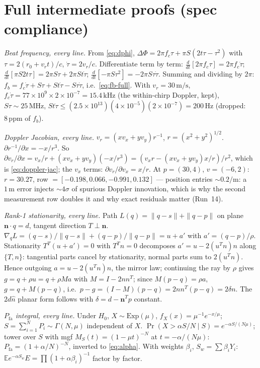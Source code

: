 \documentclass[11pt,oneside]{book}
\begin{document}
\section{Full intermediate proofs (spec compliance)}
\label{sec:full-proofs}

\emph{Beat frequency, every line.} From \cref{eq:dphi},
$\Delta\Phi=2\pi f_c\tau+\pi S(2t\tau-\tau^2)$ with $\tau=2(r_0+v_rt)/c$,
$\dot\tau=2v_r/c$. Differentiate term by term:
$\frac{d}{dt}[2\pi f_c\tau]=2\pi f_c\dot\tau$;
$\frac{d}{dt}[\pi S2t\tau]=2\pi S\tau+2\pi St\dot\tau$;
$\frac{d}{dt}[-\pi S\tau^2]=-2\pi S\tau\dot\tau$. Summing and dividing by
$2\pi$: $f_b=f_c\dot\tau+S\tau+St\dot\tau-S\tau\dot\tau$, i.e.\
\cref{eq:fb-full}. With $v_r=30\,\mathrm{m/s}$,
$f_c\dot\tau=77\times10^9\times2\times10^{-7}=15.4\,\mathrm{kHz}$ (the
within-chirp Doppler, kept), $S\tau\sim25\,\mathrm{MHz}$,
$St\dot\tau\le(2.5\times10^{13})(4\times10^{-5})(2\times10^{-7})
=200\,\mathrm{Hz}$ (dropped: $8\,\mathrm{ppm}$ of $f_b$).

\emph{Doppler Jacobian, every line.} $v_r=(xv_x+yv_y)r^{-1}$,
$r=(x^2+y^2)^{1/2}$. $\partial r^{-1}/\partial x=-x/r^3$. So
$\partial v_r/\partial x=v_x/r+(xv_x+yv_y)(-x/r^3)
=(v_xr-(xv_x+yv_y)x/r)/r^2$, which is \cref{eq:doppler-jac}; the $v_x$
terms: $\partial v_r/\partial v_x=x/r$. At $p=(30,4)$,
$v=(-6,2)$: $r=30.27$, row $=[-0.198,0.066,-0.991,0.132]$ ---
position entries $\sim0.2/\mathrm{m}$: a $1\,\mathrm{m}$ error injects
$\sim4\sigma$ of spurious Doppler innovation, which is why the second
measurement row doubles it and why exact residuals matter (Run~14).

\emph{Rank-1 stationarity, every line.} Path
$L(q)=\|q-s\|+\|q-p\|$ on plane $\mathbf{n}\cdot q=d$, tangent direction
$T\perp\mathbf{n}$. $\nabla_qL=(q-s)/\|q-s\|+(q-p)/\|q-p\|=u+a'$ with
$a'=(q-p)/\rho$. Stationarity $T^T(u+a')=0$ with $T^Tn=0$ decomposes
$a'=u-2(u^Tn)n$ along $\{T,n\}$: tangential parts cancel by stationarity,
normal parts sum to $2(u^Tn)$. Hence outgoing $a=u-2(u^Tn)n$, the mirror
law; continuing the ray by $\rho$ gives $g=q+\rho u=q+\rho Ma$ with
$M=I-2nn^T$; since $M(p-q)=\rho a$, $g=q+M(p-q)$, i.e.\
$p-g=(I-M)(p-q)=2nn^T(p-q)=2\delta n$. The $2d\hat n$ planar form follows
with $\delta=d-\mathbf{n}^Tp$ constant.

\emph{$P_{\mathrm{fa}}$ integral, every line.} Under $H_0$,
$X\sim\mathrm{Exp}(\mu)$, $f_X(x)=\mu^{-1}e^{-x/\mu}$;
$S=\sum_{i=1}^N P_i\sim\Gamma(N,\mu)$ independent of $X$.
$\Pr(X>\alpha S/N\mid S)=e^{-\alpha S/(N\mu)}$; tower over $S$ with mgf
$M_S(t)=(1-\mu t)^{-N}$ at $t=-\alpha/(N\mu)$:
$P_{\mathrm{fa}}=(1+\alpha/N)^{-N}$, inverted to \cref{eq:alpha}.
With weights $\beta_i$, $S_w=\sum\beta_iY_i$:
$\mathbb{E}e^{-\alpha S_w}E=\prod(1+\alpha\beta_i)^{-1}$ factor by factor.
\end{document}
